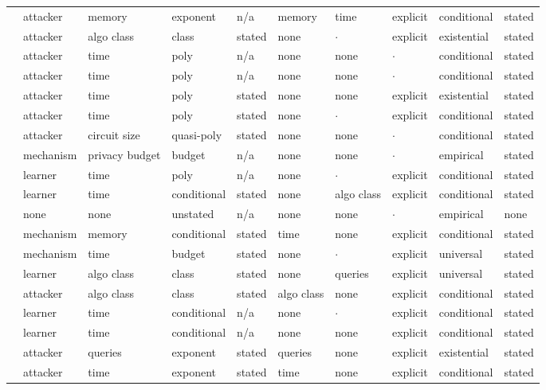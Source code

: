 \begin{landscape}
\begin{longtable}{rlllllllll}
\cite{BCEQ24} & attacker & memory & exponent & n/a & memory & time & explicit & conditional & stated \\
\cite{CIM19} & attacker & algo class & class & stated & none & $\cdot$ & explicit & existential & stated \\
\cite{HMSTY25} & attacker & time & poly & n/a & none & none & $\cdot$ & conditional & stated \\
\cite{MR25} & attacker & time & poly & n/a & none & none & $\cdot$ & conditional & stated \\
\cite{MPRV09} & attacker & time & poly & stated & none & none & explicit & existential & stated \\
\cite{CK21} & attacker & time & poly & stated & none & $\cdot$ & explicit & conditional & stated \\
\cite{ABIKN23} & attacker & circuit size & quasi-poly & stated & none & none & $\cdot$ & conditional & stated \\
\cite{ACGMMTZ16} & mechanism & privacy budget & budget & n/a & none & none & $\cdot$ & empirical & stated \\
\cite{BJ23} & learner & time & poly & n/a & none & $\cdot$ & explicit & conditional & stated \\
\cite{DHSS25} & learner & time & conditional & stated & none & algo class & explicit & conditional & stated \\
\cite{AQPWPWCR22} & none & none & unstated & n/a & none & none & $\cdot$ & empirical & none \\
\cite{DSWZ23} & mechanism & memory & conditional & stated & time & none & explicit & conditional & stated \\
\cite{RV24} & mechanism & time & budget & stated & none & $\cdot$ & explicit & universal & stated \\
\cite{FGRVX17} & learner & algo class & class & stated & none & queries & explicit & universal & stated \\
\cite{DVV16} & attacker & algo class & class & stated & algo class & none & explicit & conditional & stated \\
\cite{BIS17} & learner & time & conditional & n/a & none & $\cdot$ & explicit & conditional & stated \\
\cite{AS24} & learner & time & conditional & n/a & none & none & explicit & conditional & stated \\
\cite{ACMS23} & attacker & queries & exponent & stated & queries & none & explicit & existential & stated \\
\cite{BCS24} & attacker & time & exponent & stated & time & none & explicit & conditional & stated \\

\end{longtable}
\end{landscape}
